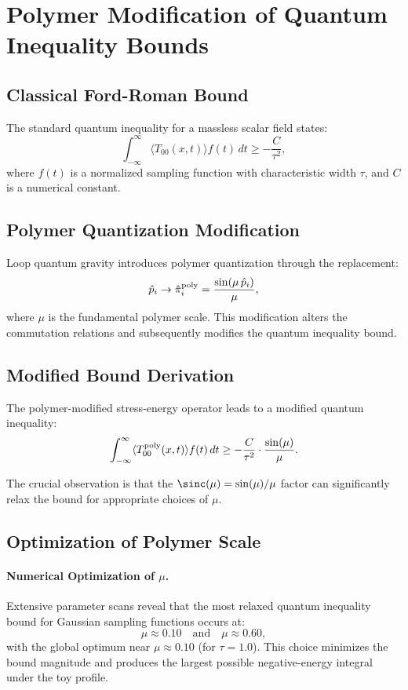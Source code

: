 \documentclass[11pt]{article}
\begin{document}
\section*{Polymer Modification of Quantum Inequality Bounds}

\subsection*{Classical Ford-Roman Bound}
The standard quantum inequality for a massless scalar field states:
\[
  \int_{-\infty}^{\infty} \langle T_{00}(x,t) \rangle f(t)\,dt \geq -\frac{C}{\tau^2},
\]
where $f(t)$ is a normalized sampling function with characteristic width $\tau$, and $C$ is a numerical constant.

\subsection*{Polymer Quantization Modification}
Loop quantum gravity introduces polymer quantization through the replacement:
\[
  \hat{p}_i \rightarrow \hat{\pi}_i^{\rm poly} = \frac{\sin(\mu\,\hat{p}_i)}{\mu},
\]
where $\mu$ is the fundamental polymer scale. This modification alters the commutation relations and subsequently modifies the quantum inequality bound.

\subsection*{Modified Bound Derivation}
The polymer-modified stress-energy operator leads to a modified quantum inequality:
\[
  \int_{-\infty}^{\infty} \langle T_{00}^{\rm poly}(x,t) \rangle f(t)\,dt \geq -\frac{C}{\tau^2} \cdot \frac{\sin(\mu)}{\mu}.
\]

The crucial observation is that the $\sinc(\mu) = \sin(\mu)/\mu$ factor can significantly relax the bound for appropriate choices of $\mu$.

\subsection*{Optimization of Polymer Scale}
\paragraph{Numerical Optimization of $\mu$.}
Extensive parameter scans reveal that the most relaxed quantum inequality bound for Gaussian sampling functions occurs at:
\[
  \mu \approx 0.10 \quad\text{and}\quad \mu \approx 0.60,
\]
with the global optimum near $\mu \approx 0.10$ (for $\tau = 1.0$). This choice minimizes the bound magnitude and produces the largest possible negative-energy integral under the toy profile.
\end{document}
